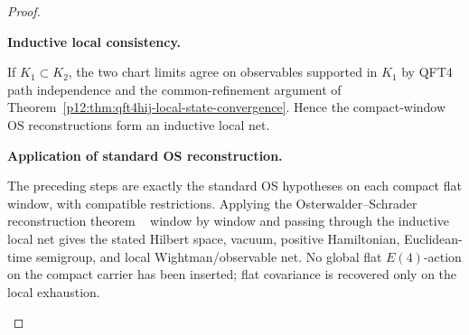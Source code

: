 \documentclass[12pt,a4paper]{article}
\begin{document}
\begin{proof}
\begin{proofsteps}
\item \textbf{Inductive local consistency.}\par\noindent
If \(K_1\subset K_2\), the two chart limits agree on observables supported in
\(K_1\) by QFT4 path independence and the common-refinement argument of
Theorem~\ref{p12:thm:qft4hij-local-state-convergence}. Hence the compact-window
OS reconstructions form an inductive local net.

\item \textbf{Application of standard OS reconstruction.}\par\noindent
The preceding steps are exactly the standard OS hypotheses on each compact flat
window, with compatible restrictions. Applying the Osterwalder--Schrader
reconstruction theorem%
~\cite{OsterwalderSchrader1973,OsterwalderSchrader1975,OsterwalderSeiler1978}
window by window and passing through the inductive local net gives the stated
Hilbert space, vacuum, positive Hamiltonian, Euclidean-time semigroup, and local
Wightman/\allowbreak observable net. No global flat \(E(4)\)-action on the
compact carrier has been inserted; flat covariance is recovered only on the
local exhaustion.

\end{proofsteps}
\end{proof}
\end{document}
